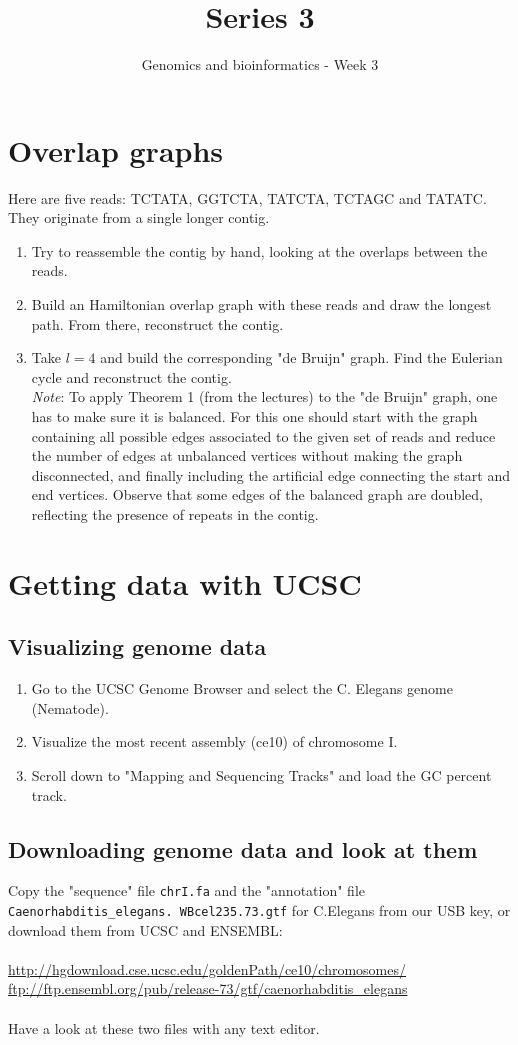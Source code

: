 \documentclass[a4paper,11pt]{article}
\title{Series 3}
\date{}
\author{Genomics and bioinformatics - Week 3}
\begin{document}
\maketitle

\section{Overlap graphs}
Here are five reads: TCTATA, GGTCTA, TATCTA, TCTAGC and TATATC. They originate from a single longer contig.
\begin{enumerate}
\item Try to reassemble the contig by hand, looking at the overlaps between the reads.
\item Build an Hamiltonian overlap graph with these reads and draw the longest path. From there, reconstruct the contig.
\item Take $l=4$ and build the corresponding "de Bruijn" graph. Find the Eulerian cycle and reconstruct the contig. \\
\textit{Note}: To apply Theorem 1 (from the lectures) to the "de Bruijn" graph, one has to make sure it is balanced. For this one should start with the graph containing all possible edges associated to the given set of reads and reduce the number of edges at unbalanced vertices without making the graph disconnected, and finally including the artificial edge connecting the start and end vertices. Observe that some edges of the balanced graph are doubled, reflecting the presence of repeats in the contig.
\end{enumerate}

\section{Getting data with UCSC}
\subsection{Visualizing genome data}
\begin{enumerate}
\item Go to the UCSC Genome Browser and select the C. Elegans genome (Nematode).
\item Visualize the most recent assembly (ce10) of chromosome I.
\item Scroll down to "Mapping and Sequencing Tracks" and load the GC percent track.
\end{enumerate}

\subsection{Downloading genome data and look at them}
Copy the "sequence" file \texttt{chrI.fa} and the "annotation" file \texttt{Caenorhabditis\_elegans. WBcel235.73.gtf} for C.Elegans from our USB key, or download them from UCSC and ENSEMBL: \\\\
\url{http://hgdownload.cse.ucsc.edu/goldenPath/ce10/chromosomes/}\\
\url{ftp://ftp.ensembl.org/pub/release-73/gtf/caenorhabditis_elegans}\\\\
Have a look at these two files with any text editor.
\end{document}
